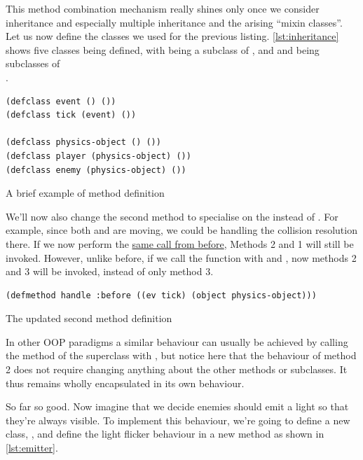 \documentclass[a4paper]{paper}
\begin{document}
This method combination mechanism really shines only once we consider inheritance and especially multiple inheritance and the arising ``mixin classes''. Let us now define the classes we used for the previous listing. \autoref{lst:inheritance} shows five classes being defined, with  being a subclass of , and  and  being subclasses of \\.

\begin{listing}[H]
\begin{verbatim}
(defclass event () ())
(defclass tick (event) ())

(defclass physics-object () ())
(defclass player (physics-object) ())
(defclass enemy (physics-object) ())
\end{verbatim}
\caption{A brief example of method definition}
\label{lst:inheritance}
\end{listing}

We'll now also change the second method to specialise on the  instead of . For example, since both  and  are moving, we could be handling the collision resolution there. If we now perform the \hyperlink{first-call}{same call from before}, Methods 2 and 1 will still be invoked. However, unlike before, if we call the function with  and , now methods 2 and 3 will be invoked, instead of only method 3.

\begin{listing}[h]
\begin{verbatim}
(defmethod handle :before ((ev tick) (object physics-object)))
\end{verbatim}
\caption{The updated second method definition}
\label{lst:updated method}
\end{listing}

In other OOP paradigms a similar behaviour can usually be achieved by calling the method of the superclass with , but notice here that the behaviour of method 2 does not require changing anything about the other methods or subclasses. It thus remains wholly encapsulated in its own behaviour.

So far so good. Now imagine that we decide enemies should emit a light so that they're always visible. To implement this behaviour, we're going to define a new class, , and define the light flicker behaviour in a new  method as shown in \autoref{lst:emitter}.
\end{document}
